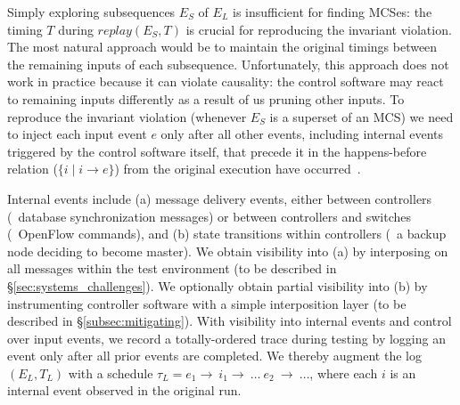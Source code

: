 Simply exploring subsequences $E_S$ of $E_L$ is insufficient for finding MCSes: the
timing $T$ during $replay(E_S, T)$ is crucial for
reproducing the invariant violation. The most natural approach would be to maintain the original
timings between the remaining inputs of each subsequence.
Unfortunately, this approach does not work in practice because it can violate
causality: the control software may react to remaining inputs differently as a result of us
pruning other inputs.
To reproduce the invariant violation (whenever $E_S$ is a superset of an MCS)
we need to inject each input event $e$ only after all other
events, including internal events triggered by the control software itself,
that precede it in the
happens-before~\cite{Lamport:1978:TCO:359545.359563}
relation ($\{i \mid i \rightarrow e\}$) from the original execution have
occurred~\cite{tel2000introduction}.

Internal events include
(a) message delivery events, either between controllers (\eg~database
synchronization messages) or
between controllers and switches (\eg~OpenFlow commands), and (b) state transitions
within controllers (\eg~a backup node deciding to become master).
We obtain visibility into (a) by interposing on all messages within the test
environment (to be described in \S\ref{sec:systems_challenges}).
We optionally obtain partial visibility into (b) by instrumenting controller
software with a simple interposition layer (to be described in \S\ref{subsec:mitigating}).
With visibility into internal events and control over input events, we
record a totally-ordered trace during testing by logging an event only after
all prior events are completed. We thereby augment the log $(E_L, T_L)$ with a schedule
$\tau_L = e_1\rightarrow~i_1\rightarrow~\dots~e_2~\rightarrow~\dots$, where
each $i$ is an internal event observed in the original run.

